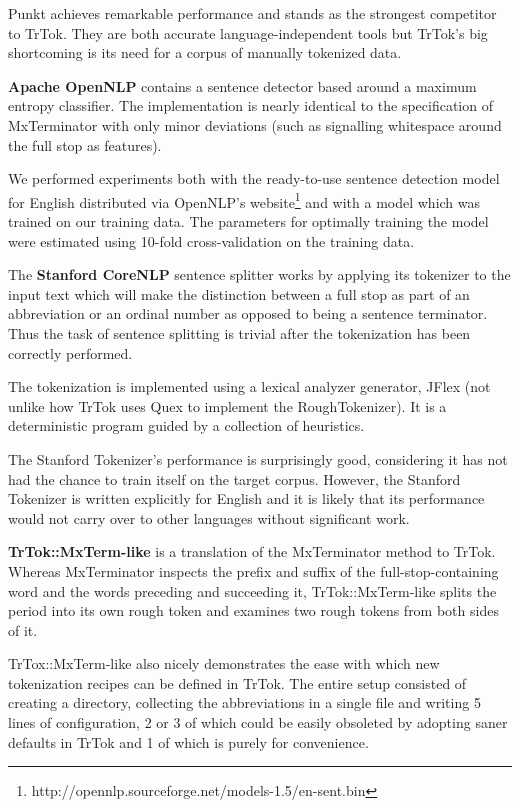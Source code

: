 Punkt achieves remarkable performance and stands as the strongest
competitor to TrTok. They are both accurate language-independent tools
but TrTok's big shortcoming is its need for a corpus of manually
tokenized data.

\textbf{Apache OpenNLP} contains a sentence detector based around a
maximum entropy classifier. The implementation is nearly identical to
the specification of MxTerminator with only minor deviations (such as
signalling whitespace around the full stop as features).

We performed experiments both with the ready-to-use sentence detection
model for English distributed via OpenNLP's
website\footnote{http://opennlp.sourceforge.net/models-1.5/en-sent.bin}
and with a model which was trained on our training data. The
parameters for optimally training the model were estimated using
10-fold cross-validation on the training data.

The \textbf{Stanford CoreNLP} sentence splitter works by applying its
tokenizer to the input text which will make the distinction between a
full stop as part of an abbreviation or an ordinal number as opposed
to being a sentence terminator. Thus the task of sentence splitting is
trivial after the tokenization has been correctly performed.

The tokenization is implemented using a lexical analyzer generator,
JFlex (not unlike how TrTok uses Quex to implement the
RoughTokenizer). It is a deterministic program guided by a collection
of heuristics.

The Stanford Tokenizer's performance is surprisingly good, considering
it has not had the chance to train itself on the target corpus.
However, the Stanford Tokenizer is written explicitly for English and
it is likely that its performance would not carry over to other
languages without significant work.

\textbf{TrTok::MxTerm-like} is a translation of the MxTerminator
method to TrTok. Whereas MxTerminator inspects the prefix and suffix
of the full-stop-containing word and the words preceding and
succeeding it, TrTok::MxTerm-like splits the period into its own rough
token and examines two rough tokens from both sides of it.

TrTox::MxTerm-like also nicely demonstrates the ease with which new
tokenization recipes can be defined in TrTok. The entire setup
consisted of creating a directory, collecting the abbreviations in a
single file and writing 5 lines of configuration, 2 or 3 of which
could be easily obsoleted by adopting saner defaults in TrTok and 1 of
which is purely for convenience.

